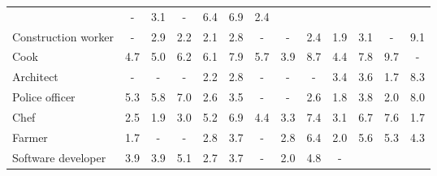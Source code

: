 \begin{table*}[p]
{\begin{tabular}{l|ccc|ccc|ccc|ccc}
& \cellcolor{lightgray} - & \cellcolor{orange1} 3.1 & \cellcolor{lightgray} -
& \cellcolor{orange2} 6.4 & \cellcolor{orange3} 6.9 & \cellcolor{blue1} 2.4
\\
Construction worker
& \cellcolor{lightgray} - & \cellcolor{blue1} 2.9 & \cellcolor{blue1} 2.2
& \cellcolor{orange1} 2.1 & \cellcolor{orange1} 2.8 & \cellcolor{lightgray} -
& \cellcolor{lightgray} - & \cellcolor{orange1} 2.4 & \cellcolor{blue1} 1.9
& \cellcolor{orange1} 3.1 & \cellcolor{lightgray} - & \cellcolor{blue3} 9.1
\\
Cook
& \cellcolor{orange2} 4.7 & \cellcolor{orange2} 5.0 & \cellcolor{orange2} 6.2
& \cellcolor{orange2} 6.1 & \cellcolor{orange3} 7.9 & \cellcolor{orange2} 5.7
& \cellcolor{orange2} 3.9 & \cellcolor{orange3} 8.7 & \cellcolor{orange2} 4.4
& \cellcolor{orange3} 7.8 & \cellcolor{orange4} 9.7 & \cellcolor{lightgray} -
\\
Architect
& \cellcolor{lightgray} - & \cellcolor{lightgray} - & \cellcolor{lightgray} -
& \cellcolor{orange1} 2.2 & \cellcolor{orange1} 2.8 & \cellcolor{lightgray} -
& \cellcolor{lightgray} - & \cellcolor{lightgray} - & \cellcolor{blue1} 3.4
& \cellcolor{orange1} 3.6 & \cellcolor{orange1} 1.7 & \cellcolor{blue3} 8.3
\\
Police officer
& \cellcolor{orange2} 5.3 & \cellcolor{orange2} 5.8 & \cellcolor{orange3} 7.0
& \cellcolor{orange1} 2.6 & \cellcolor{orange1} 3.5 & \cellcolor{lightgray} -
& \cellcolor{lightgray} - & \cellcolor{orange1} 2.6 & \cellcolor{blue1} 1.8
& \cellcolor{orange1} 3.8 & \cellcolor{orange1} 2.0 & \cellcolor{blue3} 8.0
\\
Chef
& \cellcolor{orange1} 2.5 & \cellcolor{orange1} 1.9 & \cellcolor{orange1} 3.0
& \cellcolor{orange2} 5.2 & \cellcolor{orange3} 6.9 & \cellcolor{orange2} 4.4
& \cellcolor{orange1} 3.3 & \cellcolor{orange3} 7.4 & \cellcolor{orange1} 3.1
& \cellcolor{orange3} 6.7 & \cellcolor{orange3} 7.6 & \cellcolor{blue1} 1.7
\\
Farmer
& \cellcolor{orange1} 1.7 & \cellcolor{lightgray} - & \cellcolor{lightgray} -
& \cellcolor{orange1} 2.8 & \cellcolor{orange1} 3.7 & \cellcolor{lightgray} -
& \cellcolor{orange1} 2.8 & \cellcolor{orange2} 6.4 & \cellcolor{orange1} 2.0
& \cellcolor{orange2} 5.6 & \cellcolor{orange2} 5.3 & \cellcolor{blue2} 4.3
\\
Software developer
& \cellcolor{orange2} 3.9 & \cellcolor{orange2} 3.9 & \cellcolor{orange2} 5.1
& \cellcolor{orange1} 2.7 & \cellcolor{orange1} 3.7 & \cellcolor{lightgray} -
& \cellcolor{orange1} 2.0 & \cellcolor{orange2} 4.8 & \cellcolor{lightgray} -

\end{tabular}}
\end{table*}
